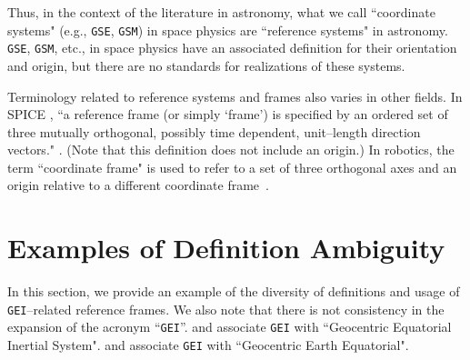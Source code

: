\documentclass[draft]{agujournal2019}
\begin{document}
Thus, in the context of the literature in astronomy, what we call ``coordinate systems" (e.g., \texttt{GSE}, \texttt{GSM}) in space physics are ``reference systems" in astronomy.  \texttt{GSE}, \texttt{GSM}, etc., in space physics have an associated definition for their orientation and origin, but there are no standards for realizations of these systems.


Terminology related to reference systems and frames also varies in other fields. In SPICE \cite{NAIFGeneral2025}, ``a reference frame (or simply `frame') is specified by an ordered set of three mutually orthogonal, possibly time dependent, unit--length direction vectors." \cite{NAIFOverview2023}. (Note that this definition does not include an origin.) In robotics, the term ``coordinate frame" is used to refer to a set of three orthogonal axes and an origin relative to a different coordinate frame~\cite{Murray2017}. 

\section{Examples of Definition Ambiguity}
\label{sect:definitions}

In this section, we provide an example of the diversity of definitions and usage of \texttt{GEI}--related reference frames. We also note that there is not consistency in the expansion of the acronym ``\texttt{GEI}''.  and  associate \texttt{GEI} with ``Geocentric Equatorial Inertial System".  and  associate \texttt{GEI} with ``Geocentric Earth Equatorial".
\end{document}
